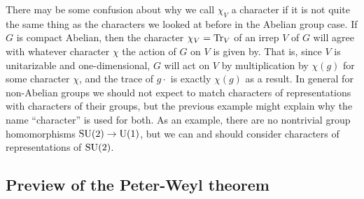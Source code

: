 \documentclass[../../rtnotes.tex]{subfiles}
\begin{document}
There may be some confusion about why we call $\chi_V$ a character if it is not quite the same thing as the characters we looked at before in the Abelian group case. If $G$ is compact Abelian, then the character $\chi_V= \Tr_V$ of an irrep $V$ of $G$ will agree with whatever character $\chi$ the action of $G$ on $V$ is given by. That is, since $V$ is unitarizable and one-dimensional, $G$ will act on $V$ by multiplication by $\chi(g)$ for some character $\chi$, and the trace of $g\cdot$ is exactly $\chi(g)$ as a result. In general for non-Abelian groups we should not expect to match characters of representations with characters of their groups, but the previous example might explain why the name ``character'' is used for both. As an example, there are no nontrivial group homomorphisms $\operatorname{SU}(2)\to \operatorname{U}(1)$, but we can and should consider characters of representations of $\operatorname{SU}(2)$.

\subsection{Preview of the Peter-Weyl theorem}
\end{document}
